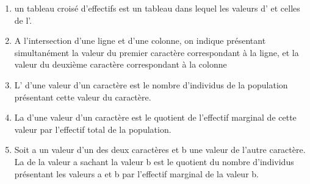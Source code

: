 \begin{definitions}
	\begin{enumerate}
		\item un tableau croisé d'effectifs est un tableau dans lequel les valeurs d' et celles de l'.
		\item A l'intersection d'une ligne et d'une colonne, on indique  présentant simultanément la valeur du premier caractère correspondant à la ligne, et la valeur du deuxième caractère correspondant à la colonne
		\item L' d'une valeur d'un caractère est le nombre d'individus de la population présentant cette valeur du caractère.
		\item La  d'une valeur d'un caractère est le quotient de l'effectif marginal de cette valeur par l'effectif total de la population.
		\item Soit a un valeur d'un des deux caractères et b une valeur de l'autre caractère.\\
		La  de la valeur a sachant la valeur b est le quotient du nombre d'individus présentant les valeurs a et b par l'effectif marginal de la valeur b. 
	\end{enumerate}
\end{definitions}

